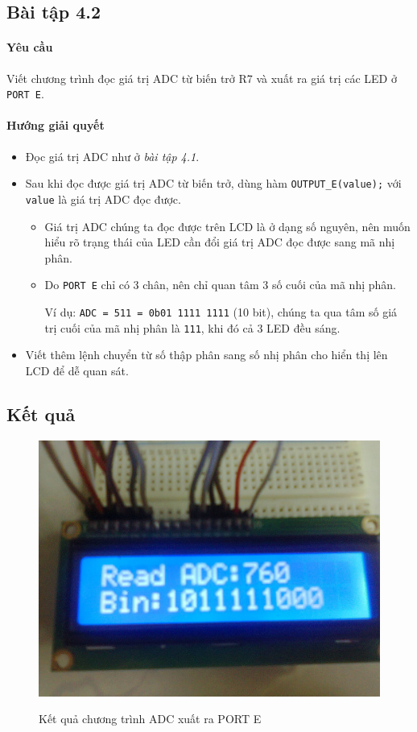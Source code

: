 \subsection{Bài tập 4.2}
\paragraph{Yêu cầu}Viết chương trình đọc giá trị ADC từ biến trở R7 và xuất ra giá trị các LED ở \verb|PORT E|.
\paragraph{Hướng giải quyết}
\begin{itemize}
\item Đọc giá trị ADC như ở \textit{bài tập 4.1}.
\item Sau khi đọc được giá trị ADC từ biến trở, dùng hàm \verb|OUTPUT_E(value);| với \verb|value| là giá trị ADC đọc được.
\begin{itemize}
\item Giá trị ADC chúng ta đọc được trên LCD là ở dạng số nguyên, nên muốn hiểu rõ trạng thái của LED cần đổi giá trị ADC đọc được sang mã nhị phân.
\item Do \verb|PORT E| chỉ có 3 chân, nên chỉ quan tâm 3 số cuối của mã nhị phân.

Ví dụ: \verb|ADC = 511 = 0b01 1111 1111| (10 bit), chúng ta qua tâm số giá trị cuối của mã nhị phân là \verb|111|, khi đó cả 3 LED đều sáng.
\end{itemize}
\item Viết thêm lệnh chuyển từ số thập phân sang số nhị phân cho hiển thị lên LCD để dễ quan sát.
\end{itemize}
\newpage
\subsection*{Kết quả}
\begin{figure}[!h]
\begin{center}
  {\includegraphics[width=.5\linewidth]{bai-4/image/4-2}}
\end{center}
\caption{Kết quả chương trình ADC xuất ra PORT E}
\end{figure}
